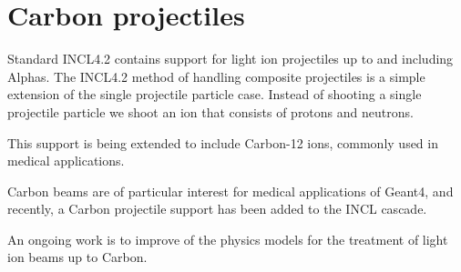\documentclass[a4paper]{jpconf}
\begin{document}
\section{Carbon projectiles}

Standard INCL4.2 contains support for light ion projectiles up to and
including Alphas. The INCL4.2 method of handling composite projectiles
is a simple extension of the single projectile particle case. Instead
of shooting a single projectile particle we shoot an ion that consists
of protons and neutrons.

This support is being extended to include Carbon-12
ions, commonly used in medical applications.

Carbon beams are of particular interest for medical applications of Geant4, 
and recently, a Carbon projectile support has been added to the INCL cascade. 

An ongoing work is to improve of the physics models for the treatment of light ion beams up to Carbon.





\ack %




\end{document}
